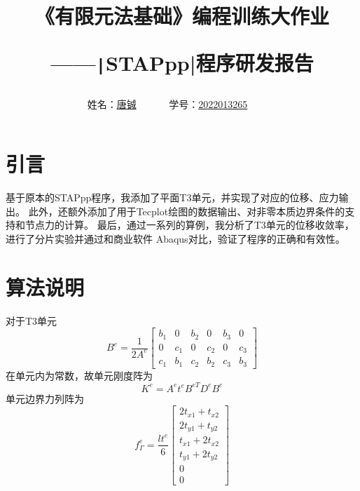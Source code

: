 \documentclass[12pt,a4paper]{article}
\newcommand{\code}{\texttt}
\begin{document}
\title{
{\heiti《有限元法基础》编程训练大作业
}

{
——\code|STAPpp|程序研发报告
}
}
\date{}

\author{
姓名：\underline{唐铖}~~~~~~
学号：\underline{2022013265}~~~~~~}

\maketitle

\section{引言}
基于原本的STAPpp程序，我添加了平面T3单元，并实现了对应的位移、应力输出。
此外，还额外添加了用于Tecplot绘图的数据输出、对非零本质边界条件的支持和节点力的计算。
最后，通过一系列的算例，我分析了T3单元的位移收敛率，进行了分片实验并通过和商业软件
Abaqus对比，验证了程序的正确和有效性。

\section{算法说明}
对于T3单元\cite{zhang2003}
\begin{equation}
    B^e = \frac{1}{2A^e}
    \begin{bmatrix}
        b_1 & 0 & b_2 & 0 & b_3 & 0\\
        0 & c_1 & 0 & c_2 & 0 & c_3\\
        c_1 & b_1 & c_2 & b_2 & c_3 & b_3
    \end{bmatrix}
\end{equation}
在单元内为常数，故单元刚度阵为
\begin{equation}
    K^e = A^et^eB^{eT}D^eB^e
\end{equation}
单元边界力列阵为
\begin{equation}
    f^e_{\Gamma} = 
    \frac{lt^e}{6}
    \begin{bmatrix}
        2t_{x1} + t_{x2}\\
        2t_{y1} + t_{y2}\\
        t_{x1} + 2t_{x2}\\
        t_{y1} + 2t_{y2}\\
        0\\0
    \end{bmatrix}
\end{equation}
\end{document}
